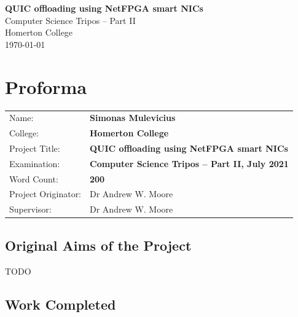 \documentclass[12pt,a4paper,twoside,openright]{report}
\begin{document}





\pagestyle{empty}


\vspace*{60mm}
\begin{center}
\Huge
\textbf{QUIC offloading using NetFPGA smart NICs} \\[5mm]
Computer Science Tripos -- Part II \\[5mm]
Homerton College \\[5mm]
\today  %
\end{center}


\pagestyle{plain}

\chapter*{Proforma}

{\large
\begin{tabular}{ll}
Name:               & \bf Simonas Mulevicius                       \\
College:            & \bf Homerton College                     \\
Project Title:      & \bf QUIC offloading using NetFPGA smart NICs \\
Examination:        & \bf Computer Science Tripos -- Part II, July 2021  \\
Word Count:         & \bf 200\footnotemark[1] \\
Project Originator: & Dr Andrew W. Moore                \\
Supervisor:         & Dr Andrew W. Moore                \\ 
\end{tabular}
}


\section*{Original Aims of the Project}

TODO

\section*{Work Completed}
\end{document}
